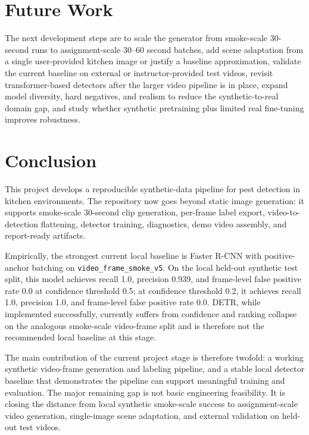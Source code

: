 \documentclass[11pt]{article}
\begin{document}
\section{Future Work}
The next development steps are to scale the generator from smoke-scale 30-second runs to assignment-scale 30--60 second batches, add scene adaptation from a single user-provided kitchen image or justify a baseline approximation, validate the current baseline on external or instructor-provided test videos, revisit transformer-based detectors after the larger video pipeline is in place, expand model diversity, hard negatives, and realism to reduce the synthetic-to-real domain gap, and study whether synthetic pretraining plus limited real fine-tuning improves robustness.


\section{Conclusion}
This project develops a reproducible synthetic-data pipeline for pest detection in kitchen environments. The repository now goes beyond static image generation: it supports smoke-scale 30-second clip generation, per-frame label export, video-to-detection flattening, detector training, diagnostics, demo video assembly, and report-ready artifacts.

Empirically, the strongest current local baseline is Faster R-CNN with positive-anchor batching on \texttt{video\_frame\_smoke\_v5}. On the local held-out synthetic test split, this model achieves recall 1.0, precision 0.939, and frame-level false positive rate 0.0 at confidence threshold 0.5; at confidence threshold 0.2, it achieves recall 1.0, precision 1.0, and frame-level false positive rate 0.0. DETR, while implemented successfully, currently suffers from confidence and ranking collapse on the analogous smoke-scale video-frame split and is therefore not the recommended local baseline at this stage.

The main contribution of the current project stage is therefore twofold: a working synthetic video-frame generation and labeling pipeline, and a stable local detector baseline that demonstrates the pipeline can support meaningful training and evaluation. The major remaining gap is not basic engineering feasibility. It is closing the distance from local synthetic smoke-scale success to assignment-scale video generation, single-image scene adaptation, and external validation on held-out test videos.



\end{document}
